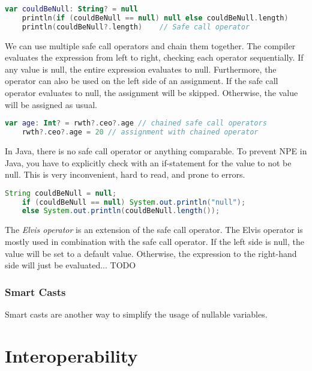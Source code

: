 \documentclass[a4paper, 11pt]{article}
\begin{document}
  \begin{lstlisting}[language=Kotlin,title={Using the safe call operator in comparison to an if statement}]
    var couldBeNull: String? = null
    println(if (couldBeNull == null) null else couldBeNull.length)
    println(couldBeNull?.length)    // Safe call operator
  \end{lstlisting}
  We can use multiple safe call operators and chain them together. The compiler evaluates the expression from left to right, checking each operator sequentially. If any value is null, the entire expression evaluates to null.
  Furthermore, the operator can also be used on the left side of an assignment. If the safe call operator evaluates to null, the assignment will be skipped. Otherwise, the value will be assigned as usual.
  \begin{lstlisting}[language=Kotlin]
    var age: Int? = rwth?.ceo?.age // chained safe call operators
    rwth?.ceo?.age = 20 // assignment with chained operator
  \end{lstlisting}

  In Java, there is no safe call operator or anything comparable. To prevent NPE in Java, you have to explicitly check with an if-statement for the value to not be null. This is very inconvenient, hard to read, and prone to errors.
  \begin{lstlisting}[language=Java,title={Prevent NPE in Java}]
    String couldBeNull = null;
    if (couldBeNull == null) System.out.println("null");
    else System.out.println(couldBeNull.length());
  \end{lstlisting}
  \hfill \break

  The \textit{Elvis operator} is an extension of the safe call operator. The Elvis operator is mostly used in combination with the safe call operator. If the left side is null, the value will be set to a default value. Otherwise, the expression to the right-hand side will just be evaluated... TODO

\subsubsection{Smart Casts}
  Smart casts are another way to simplify the usage of nullable variables.


\section{Interoperability}
\end{document}
